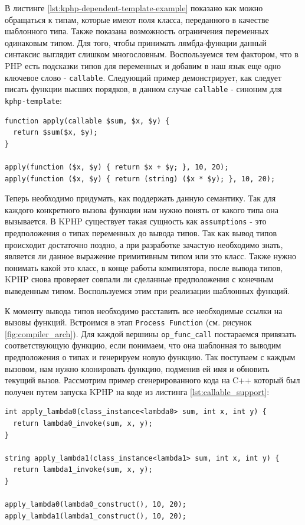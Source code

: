 В листинге \ref{lst:kphp-dependent-template-example} показано как можно обращаться к типам, которые имеют поля класса, переданного в качестве шаблонного типа.
Также показана возможность ограничения переменных одинаковым типом.
Для того, чтобы принимать лямбда-функции данный синтаксис выглядит слишком многословным.
Воспользуемся тем фактором, что в PHP есть подсказки типов для переменных и добавим в наш язык еще одно ключевое слово - \verb|callable|.
Следующий пример демонстрирует, как следует писать функции высших порядков, в данном случае \verb|callable| - синоним для \verb|kphp-template|:
\begin{lstlisting}[caption={Пример использования ключевого слова callable},label={lst:callable_support}]
function apply(callable $sum, $x, $y) {
  return $sum($x, $y);
}

apply(function ($x, $y) { return $x + $y; }, 10, 20);
apply(function ($x, $y) { return (string) ($x * $y); }, 10, 20);
\end{lstlisting}

Теперь необходимо придумать, как поддержать данную семантику.
Так для каждого конкретного вызова функции нам нужно понять от какого типа она вызывается.
В KPHP существует такая сущность как \verb|assumptions| - это предположения о типах переменных до вывода типов.
Так как вывод типов происходит достаточно поздно, а при разработке зачастую необходимо знать, является ли данное выражение примитивным типом или это класс.
Также нужно понимать какой это класс, в конце работы компилятора, после вывода типов, KPHP снова проверяет совпали ли сделанные предположения с конечным выведенным типом.
Воспользуемся этим при реализации шаблонных функций.

К моменту вывода типов необходимо расставить все необходимые ссылки на вызовы функций.
Встроимся в этап \verb|Process Function| (см. рисунок \ref{fig:compiler_arch}).
Для каждой вершины \verb|op_func_call| постараемся привязать соответствующую функцию, если понимаем, что она шаблонная то выводим предположения о типах и генерируем новую функцию.
Так поступаем с каждым вызовом, нам нужно клонировать функцию, подменив ей имя и обновить текущий вызов.
Рассмотрим пример сгенерированного кода на C++ который был получен путем запуска KPHP на коде из листинга \ref{lst:callable_support}:
\begin{lstlisting}
int apply_lambda0(class_instance<lambda0> sum, int x, int y) {
  return lambda0_invoke(sum, x, y);
}

string apply_lambda1(class_instance<lambda1> sum, int x, int y) {
  return lambda1_invoke(sum, x, y);
}

apply_lambda0(lambda0_construct(), 10, 20);
apply_lambda1(lambda1_construct(), 10, 20);
\end{lstlisting}

